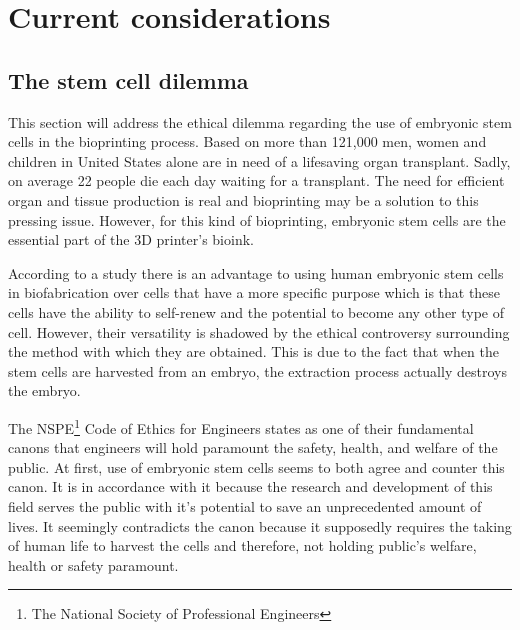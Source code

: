 \documentclass[12pt]{article} %
\begin{document}
\newpage


\section{Current considerations} %

\subsection{The stem cell dilemma} %

This section will address the ethical dilemma regarding the use of embryonic stem cells in the bioprinting process. 
Based on \cite{OPTN data as of January 2016} more than 121,000 men, women and children in United States alone are in need of a lifesaving organ transplant. Sadly, on average 22 people die each day waiting for a transplant. The need for efficient organ and tissue production is real and bioprinting may be a solution to this pressing issue. However, for this kind of bioprinting, embryonic stem cells are the essential part of the 3D printer's bioink.

According to a study \cite{Faulkner-Jones:2013} there is an advantage to using human embryonic stem cells in biofabrication over cells that have a more specific purpose which is that these cells have the ability to self-renew and the potential to become any other type of cell. However, their versatility is shadowed by the ethical controversy surrounding the method with which they are obtained. This is due to the fact that when the stem cells are harvested from an embryo, the extraction process actually destroys the embryo. 

The NSPE\footnote{The National Society of Professional Engineers} Code of Ethics for Engineers states as one of their fundamental canons that engineers will hold paramount the safety, health, and welfare of the public. At first, use of embryonic stem cells seems to both agree and counter this canon. 
It is in accordance with it because the research and development of this field serves the public with it's potential to save an unprecedented amount of lives. 
It seemingly contradicts the canon because it supposedly requires the taking of human life to harvest the cells and therefore, not holding public's welfare, health or safety paramount. 
\end{document}
